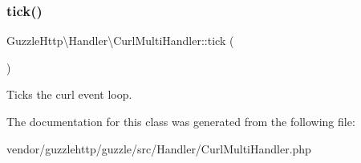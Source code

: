 \subsubsection{\texorpdfstring{tick()}{tick()}}
{\footnotesize\ttfamily Guzzle\+Http\textbackslash{}\+Handler\textbackslash{}\+Curl\+Multi\+Handler\+::tick (\begin{DoxyParamCaption}{ }\end{DoxyParamCaption})}

Ticks the curl event loop. 

The documentation for this class was generated from the following file\+:\begin{DoxyCompactItemize}
\item 
vendor/guzzlehttp/guzzle/src/\+Handler/Curl\+Multi\+Handler.\+php\end{DoxyCompactItemize}
